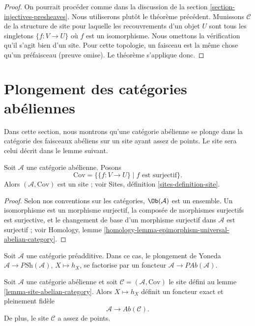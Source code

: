 \begin{proof}
On pourrait procéder comme dans la discussion de la
section \ref{section-injectives-presheaves}. Nous utiliserons plutôt le
théorème précédent. Munissons $\mathcal{C}$ de la structure de site pour
laquelle les recouvrements d'un objet $U$ sont tous les singletons
$\{f : V \to U\}$ où $f$ est un isomorphisme. Nous omettons la vérification
qu'il s'agit bien d'un site. Pour cette topologie, un faisceau est la même chose
qu'un préfaisceau (preuve omise). Le théorème s'applique donc.
\end{proof}








\section{Plongement des catégories abéliennes}
\label{section-embedding}

\noindent
Dans cette section, nous montrons qu'une catégorie abélienne se plonge dans la
catégorie des faisceaux abéliens sur un site ayant assez de points. Le site
sera celui décrit dans le lemme suivant.

\begin{lemma}
\label{lemma-site-abelian-category}
Soit $\mathcal{A}$ une catégorie abélienne. Posons
$$
\text{Cov} = \{\{f : V \to U\} \mid f\text{ est surjectif}\}.
$$
Alors $(\mathcal{A}, \text{Cov})$ est un site ; voir
Sites, définition \ref{sites-definition-site}.
\end{lemma}

\begin{proof}
Selon nos conventions sur les catégories, $\Ob(\mathcal{A})$ est un ensemble.
Un isomorphisme est un morphisme surjectif, la composée de morphismes
surjectifs est surjective, et le changement de base d'un morphisme surjectif
dans $\mathcal{A}$ est surjectif ; voir
Homology, lemme \ref{homology-lemma-epimorphism-universal-abelian-category}.
\end{proof}

\noindent
Soit $\mathcal{A}$ une catégorie préadditive. Dans ce cas, le plongement de
Yoneda $\mathcal{A} \to \textit{PSh}(\mathcal{A})$, $X \mapsto h_X$, se
factorise par un foncteur $\mathcal{A} \to \textit{PAb}(\mathcal{A})$.

\begin{lemma}
\label{lemma-embedding}
Soit $\mathcal{A}$ une catégorie abélienne et soit
$\mathcal{C} = (\mathcal{A}, \text{Cov})$ le site défini au
lemme \ref{lemma-site-abelian-category}. Alors $X \mapsto h_X$ définit un
foncteur exact et pleinement fidèle
$$
\mathcal{A} \longrightarrow \textit{Ab}(\mathcal{C}).
$$
De plus, le site $\mathcal{C}$ a assez de points.
\end{lemma}

